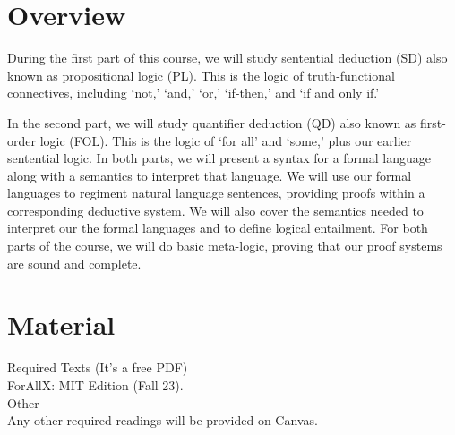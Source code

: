 \documentclass[letterpaper]{inzane_syllabus} %
\begin{document}

\makeprofile %

\section{Overview}

During the first part of this course, we will study sentential deduction (SD) also known as propositional logic (PL). 
This is the logic of truth-functional connectives, including ‘not,’ ‘and,’ ‘or,’ ‘if-then,’ and ‘if and only if.’ 

In the second part, we will study quantifier deduction (QD) also known as first-order logic (FOL). 
This is the logic of ‘for all’ and ‘some,’ plus our earlier sentential logic. 
In both parts, we will present a syntax for a formal language along with a semantics to interpret that language.
We will use our formal languages to regiment natural language sentences, providing proofs within a corresponding deductive system. 
We will also cover the semantics needed to interpret our the formal languages and to define logical entailment. 
For both parts of the course, we will do basic meta-logic, proving that our proof systems are sound and complete.

\vspace{0.5cm} %
\section{Material}

{\color{myCOLOR} Required Texts (It’s a free PDF)}\\
ForAllX: MIT Edition (Fall 23). \\

{\color{myCOLOR} Other}\\
Any other required readings will be provided on Canvas.
\end{document}
